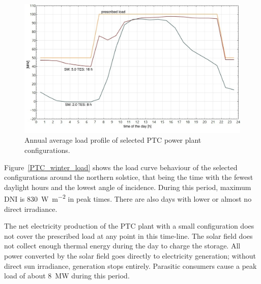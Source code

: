 \begin{figure}[htbp]  
\centering
\includegraphics[width=0.9\linewidth]{FIG/PTC_annual_profil}
\caption[Annual average load profile of selected PTC power plant configurations.]{Annual average load profile of selected PTC power plant configurations.}\label{PTC_annual_profil}
\end{figure}

Figure~\ref{PTC_winter_load} shows the load curve behaviour of the selected configurations around the northern solstice, that being the time with the fewest daylight hours and the lowest angle of incidence. During this period, maximum \ac{DNI} is \SI{830}{\watt\per\square\metre} in peak times. There are also days with lower or almost no direct irradiance.


The net electricity production of the \ac{PTC} plant with a small configuration does not cover the prescribed load at any point in this time-line. The solar field does not collect enough thermal energy during the day to charge the storage. All power converted by the solar field goes directly to electricity generation; without direct sun irradiance, generation stops entirely. Parasitic consumers cause a peak load of about \SI{8}{MW} during this period.

